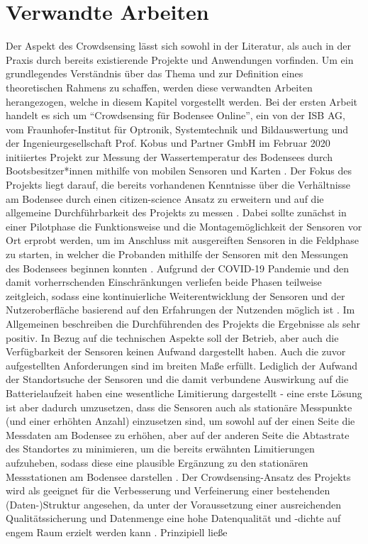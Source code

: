 \section{Verwandte Arbeiten}
\label{sec:related_work}
Der Aspekt des Crowdsensing lässt sich sowohl in der Literatur, als auch in der Praxis durch bereits existierende Projekte und Anwendungen vorfinden. Um ein grundlegendes Verständnis über das Thema und zur Definition eines theoretischen Rahmens zu schaffen, werden diese verwandten Arbeiten herangezogen, welche in diesem Kapitel vorgestellt werden. \newline Bei der ersten Arbeit handelt es sich um \enquote{Crowdsensing für Bodensee Online}, ein von der ISB AG, vom Fraunhofer-Institut für Optronik, Systemtechnik und Bildauswertung und der Ingenieurgesellschaft Prof. Kobus und Partner GmbH im Februar 2020 initiiertes Projekt zur Messung der Wassertemperatur des Bodensees durch Bootsbesitzer*innen mithilfe von mobilen Sensoren und Karten \cite {Ministerium2021}. Der Fokus des Projekts liegt darauf, die bereits vorhandenen Kenntnisse über die Verhältnisse am Bodensee durch einen citizen-science Ansatz zu erweitern und auf die allgemeine Durchführbarkeit des Projekts zu messen \cite{Bodensee2021}. Dabei sollte zunächst in einer Pilotphase die Funktionsweise und die Montagemöglichkeit der Sensoren vor Ort erprobt werden, um im Anschluss mit ausgereiften Sensoren in die Feldphase zu starten, in welcher die Probanden mithilfe der Sensoren mit den Messungen des Bodensees beginnen konnten \cite{Bodensee2021}. Aufgrund der COVID-19 Pandemie und den damit vorherrschenden Einschränkungen verliefen beide Phasen teilweise zeitgleich, sodass eine kontinuierliche Weiterentwicklung der Sensoren und der Nutzeroberfläche basierend auf den Erfahrungen der Nutzenden möglich ist \cite{Bodensee2021}. Im Allgemeinen beschreiben die Durchführenden des Projekts die Ergebnisse als sehr positiv. \newline In Bezug auf die technischen Aspekte soll der Betrieb, aber auch die Verfügbarkeit der Sensoren keinen Aufwand dargestellt haben. Auch die zuvor aufgestellten Anforderungen sind im breiten Maße erfüllt. Lediglich der Aufwand der Standortsuche der Sensoren und die damit verbundene Auswirkung auf die Batterielaufzeit haben eine wesentliche Limitierung dargestellt - eine erste Lösung ist aber dadurch umzusetzen, dass die Sensoren auch als stationäre Messpunkte (und einer erhöhten Anzahl) einzusetzen sind, um sowohl auf der einen Seite die Messdaten am Bodensee zu erhöhen, aber auf der anderen Seite die Abtastrate des Standortes zu minimieren, um die bereits erwähnten Limitierungen aufzuheben, sodass diese eine plausible Ergänzung zu den stationären Messstationen am Bodensee darstellen \cite{Bodensee2021}. Der Crowdsensing-Ansatz des Projekts wird als geeignet für die Verbesserung und Verfeinerung einer bestehenden (Daten-)Struktur angesehen, da unter der Voraussetzung einer ausreichenden Qualitätssicherung und Datenmenge eine hohe Datenqualität und -dichte auf engem Raum erzielt werden kann \cite{Bodensee2021}. Prinzipiell ließe 